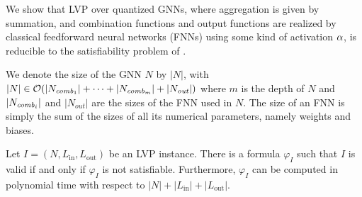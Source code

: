 We show that LVP over quantized GNNs, where aggregation is given by summation, and combination functions and output functions are realized by classical feedforward neural networks (FNNs) using some kind of activation $\alpha$, is reducible to the satisfiability problem of \thelogic{}.

We denote the size of the GNN $N$ by $|N|$, with $|N| \in \mathcal{O}(|N_{\mathit{comb}_1}| + \dotsb + |N_{\mathit{comb}_m}| + |N_{\mathit{out}}|)$ where 
$m$ is the depth of $N$ and $|N_{\mathit{comb}_i}|$ and 
$|N_{\mathit{out}}|$ are the sizes of the FNN used in $N$. The size of an FNN is simply the sum of the sizes of all its numerical parameters, namely weights and biases.


\begin{theorem}
\label{th:reduction}
    Let $I = (N, L_{\text{in}}, L_{\text{out}})$ be an LVP instance. There is a \thelogic{} formula $\varphi_I$ such that $I$ is valid 
    if and only if $\varphi_I$ is not satisfiable. Furthermore, $\varphi_I$ can be computed in polynomial time with respect to $|N| + |L_{\text{in}}| + |L_{\text{out}}|$.
\end{theorem}


